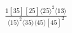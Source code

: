 \documentclass[varwidth, border=5pt]{standalone}
\begin{document}
\begin{my}
$\begin{gathered}
\scriptscriptstyle\frac{1[35][25]⟨25⟩^2⟨13⟩}{⟨15⟩^2⟨35⟩⟨45⟩[45]^2}
\end{gathered}$
\end{my}
\end{document}
